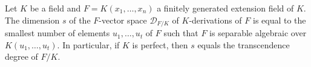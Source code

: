 Let $K$ be a field and $F = K(x_1, \ldots, x_n)$ a finitely generated extension field of $K$. The dimension $s$ of the $F$-vector space $\mathcal{D}_{F/K}$ of $K$-derivations of $F$ is equal to the smallest number of elements $u_1, \ldots, u_t$ of $F$ such that $F$ is separable algebraic over $K(u_1, \ldots, u_t)$. In particular, if $K$ is perfect, then $s$ equals the transcendence degree of $F/K$.
